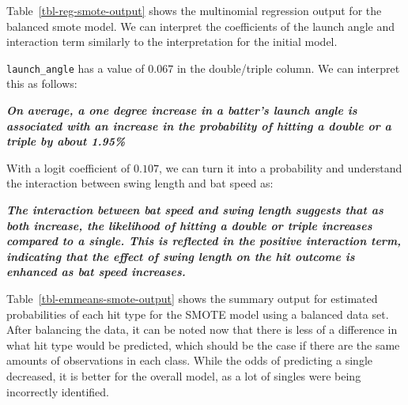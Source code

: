 \documentclass[
  letterpaper,
  DIV=11,
  numbers=noendperiod]{scrartcl}
\begin{document}
Table~\ref{tbl-reg-smote-output} shows the multinomial regression output
for the balanced smote model. We can interpret the coefficients of the
launch angle and interaction term similarly to the interpretation for
the initial model.

\texttt{launch\_angle} has a value of \(0.067\) in the double/triple
column. We can interpret this as follows:

\textbf{\emph{On average, a one degree increase in a batter's launch
angle is associated with an increase in the probability of hitting a
double or a triple by about 1.95\%}}

With a logit coefficient of \(0.107\), we can turn it into a probability
and understand the interaction between swing length and bat speed as:

\textbf{\emph{The interaction between bat speed and swing length
suggests that as both increase, the likelihood of hitting a double or
triple increases compared to a single. This is reflected in the positive
interaction term, indicating that the effect of swing length on the hit
outcome is enhanced as bat speed increases.}}

\begin{table}

\caption{\label{tbl-emmeans-smote-output}Stage 1 emmeans Summary Output
for SMOTE Model}


\end{table}%

Table~\ref{tbl-emmeans-smote-output} shows the summary output for
estimated probabilities of each hit type for the SMOTE model using a
balanced data set. After balancing the data, it can be noted now that
there is less of a difference in what hit type would be predicted, which
should be the case if there are the same amounts of observations in each
class. While the odds of predicting a single decreased, it is better for
the overall model, as a lot of singles were being incorrectly
identified.
\end{document}
